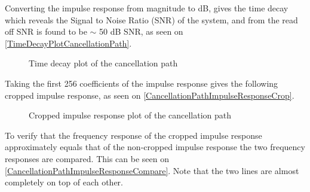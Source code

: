 
Converting the impulse response from magnitude to dB, gives the time decay which reveals the Signal to Noise Ratio (SNR) of the system, and from the read off SNR is found to be $\sim$ 50 dB SNR, as seen on \autoref{TimeDecayPlotCancellationPath}.



\begin{figure}[H]
	\centering
	
	\caption{Time decay plot of the cancellation path}
	\label{TimeDecayPlotCancellationPath}
\end{figure}


Taking the first 256 coefficients of the impulse response gives the following cropped impulse response, as seen on \autoref{CancellationPathImpulseResponseCrop}.

\begin{figure}[H]
	\centering
	
	\caption{Cropped impulse response plot of the cancellation path}
	\label{CancellationPathImpulseResponseCrop}
\end{figure}

To verify that the frequency response of the cropped impulse response approximately equals that of the non-cropped impulse response the two frequency responses are compared. This can be seen on \autoref{CancellationPathImpulseResponseCompare}. Note that the two lines are almost completely on top of each other.

